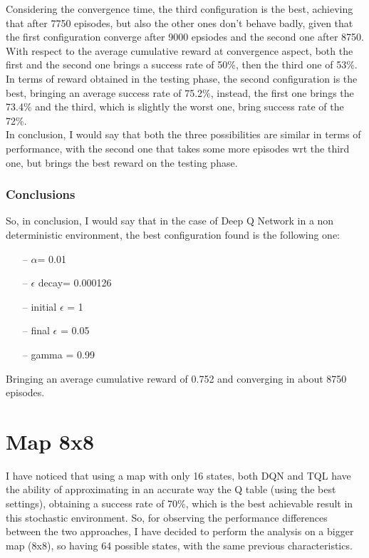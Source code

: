 \documentclass{article}
\begin{document}
\clearpage


Considering the convergence time, the third configuration is the best, achieving that after 7750 episodes, but also the other ones don't behave badly, given that the first configuration converge after 
9000 epsiodes and the second one after 8750.
\\
With respect to the average cumulative reward at convergence aspect, both the first and the second one brings a success rate of 50\%, then the third one of 53\%.
\\
In terms of reward obtained in the testing phase, the second configuration is the best, bringing an average success rate of 75.2\%, instead, the first one brings the 73.4\% and the third,
which is slightly the worst one, bring success rate of the 72\%.
\\
In conclusion, I would say that both the three possibilities are similar in terms of performance, with the second one that takes some more episodes wrt the third one, but brings the best reward on the testing phase.


\subsubsection{Conclusions}

So, in conclusion, I would say that in the case of Deep Q Network in a non deterministic environment, the best configuration found is the following one:
\begin{itemize}
\item[--] $\alpha$= 0.01
\item[--] $\epsilon$ decay= 0.000126
\item[--] initial $\epsilon$ = 1
\item[--] final $\epsilon$ = 0.05
\item[--] gamma = 0.99
\end{itemize}

Bringing an average cumulative reward of 0.752 and converging in about 8750 episodes.   




\section{Map 8x8}

I have noticed that using a map with only 16 states, both DQN and TQL have the ability of approximating in an accurate way the Q table (using the best settings), obtaining a success rate of 70\%, which is the best achievable result in this stochastic environment.
So, for observing the performance differences between the two approaches, I have decided to perform the analysis on a bigger map (8x8), so having 64 possible states, with the same previous characteristics.
\end{document}

